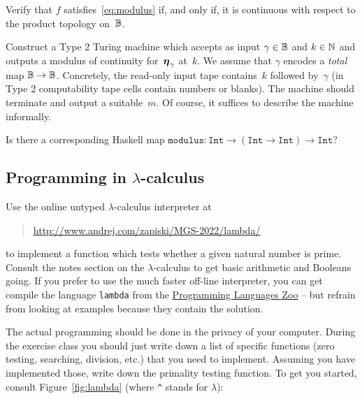 \documentclass{article}
\begin{document}
Verify that $f$ satisfies~\eqref{eq:modulus} if, and only if, it is continuous with respect to the product topology on~$\mathbb{B}$.

Construct a Type 2 Turing machine which accepts as input $\gamma \in \mathbb{B}$ and $k \in \mathbb{N}$ and outputs a modulus of continuity for~$\text{\boldmath{$\eta$}}_\gamma$ at~$k$. We assume that $\gamma$ encodes a \emph{total} map $\mathbb{B} \to \mathbb{B}$. Concretely, the read-only input tape contains~$k$ followed by~$\gamma$ (in Type 2 computability tape cells contain numbers or blanks). The machine should terminate and output a suitable~$m$. Of course, it suffices to describe the machine informally.

\medskip

Is there a corresponding Haskell map $\mathtt{modulus} : \mathtt{Int} \to (\mathtt{Int} \to \mathtt{Int}) \to \mathtt{Int}$?


\subsection{Programming in $\lambda$-calculus}
\label{sec:encod-gener-recurs}

Use the online untyped $\lambda$-calculus interpreter at
%
\begin{quote}
  \url{http://www.andrej.com/zapiski/MGS-2022/lambda/}
\end{quote}
%
to implement a function which tests whether a given natural number is prime. Consult the notes section on the $\lambda$-calculus to get basic arithmetic and Booleans going.
%
If you prefer to use the much faster off-line interpreter, you can get compile the language \texttt{lambda} from the \href{http://plzoo.andrej.com/language/lambda.html}{Programming Languages Zoo} -- but refrain from looking at examples because they contain the solution.

The actual programming should be done in the privacy of your computer. During the exercise class you should just write down a list of specific functions (zero testing, searching, division, etc.) that you need to implement. Assuming you have implemented those, write down the primality testing function. To get you started, consult Figure~\ref{fig:lambda} (where \lstinline|^| stands for $\lambda$):
\end{document}
